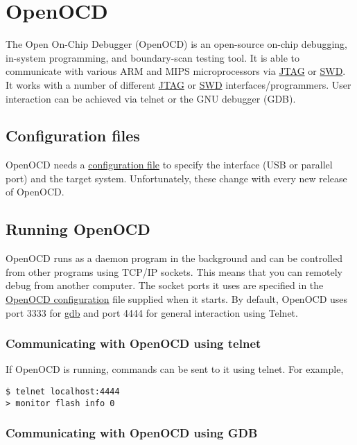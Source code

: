 \chapter{OpenOCD}

The Open On-Chip Debugger (OpenOCD) is an open-source on-chip debugging,
in-system programming, and boundary-scan testing tool. It is able to
communicate with various ARM and MIPS microprocessors via \url{JTAG} or
\url{SWD}. It works with a number of different \url{JTAG} or \url{SWD}
interfaces/programmers. User interaction can be achieved via telnet or
the GNU debugger (GDB).

\section{Configuration files}
\label{configuration-files}

OpenOCD needs a \href{OpenOCD_configuration}{configuration file} to
specify the interface (USB or parallel port) and the target system.
Unfortunately, these change with every new release of OpenOCD.

\section{Running OpenOCD}
\label{running-openocd}

OpenOCD runs as a daemon program in the background and can be controlled
from other programs using TCP/IP sockets. This means that you can
remotely debug from another computer. The socket ports it uses are
specified in the \href{OpenOCD_configuration}{OpenOCD configuration}
file supplied when it starts. By default, OpenOCD uses port 3333 for
\url{gdb} and port 4444 for general interaction using Telnet.

\subsection{Communicating with OpenOCD using telnet}
\label{communicating-with-openocd-using-telnet}

If OpenOCD is running, commands can be sent to it using telnet. For
example,

\begin{verbatim}
$ telnet localhost:4444
> monitor flash info 0
\end{verbatim}

\subsection{Communicating with OpenOCD using GDB}
\label{communicating-with-openocd-using-gdb}

